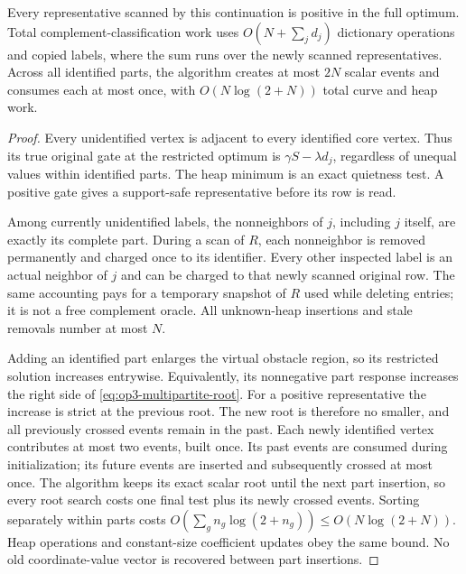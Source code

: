 \begin{lemma}
\label{lem:op3-multipartite-paid-events}
Every representative scanned by this continuation is positive in the
full optimum. Total complement-classification work uses
$O(N+\sum_jd_j)$ dictionary operations and copied labels, where the sum
runs over the newly scanned representatives. Across all identified parts,
the algorithm creates at most $2N$ scalar events and consumes each at most
once, with $O(N\log(2+N))$ total curve and heap work.
\end{lemma}
\begin{proof}
Every unidentified vertex is adjacent to every identified core vertex.
Thus its true original gate at the restricted optimum is
$\gamma S-\lambda d_j$, regardless of unequal values within identified
parts. The heap minimum is an exact quietness test. A positive gate gives
a support-safe representative before its row is read.

Among currently unidentified labels, the nonneighbors of $j$, including
$j$ itself, are exactly its complete part. During a scan of $R$, each
nonneighbor is removed permanently and charged once to its identifier.
Every other inspected label is an actual neighbor of $j$ and can be charged
to that newly scanned original row. The same accounting pays for a temporary
snapshot of $R$ used while deleting entries; it is not a free complement
oracle. All unknown-heap insertions and stale removals number at most $N$.

Adding an identified part enlarges the virtual obstacle region, so its
restricted solution increases entrywise. Equivalently, its nonnegative
part response increases the right side of \cref{eq:op3-multipartite-root}.
For a positive representative the increase is strict at the previous root.
The new root is therefore no smaller, and all previously crossed events
remain in the past. Each newly identified vertex contributes at most two
events, built once. Its past events are consumed during initialization;
its future events are inserted and subsequently crossed at most once.
The algorithm keeps its exact scalar root until the next part insertion,
so every root search costs one final test plus its newly crossed events.
Sorting separately within parts costs
$O(\sum_g n_g\log(2+n_g))\leq O(N\log(2+N))$.
Heap operations and constant-size coefficient updates obey the same bound.
No old coordinate-value vector is recovered between part insertions.
\end{proof}

